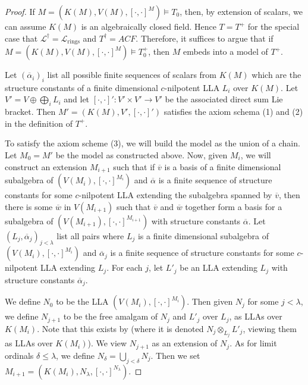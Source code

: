 \documentclass[psamsfonts]{amsart}
\theoremstyle{definition}
\theoremstyle{definition}
\theoremstyle{remark}
\numberwithin{equation}{section}
\newcommand\LL{\mathscr{L}}
\renewcommand{\models}{\vDash}
\begin{document}
\begin{proof}
 If $M = (K(M), V(M), [\cdot,\cdot]^{M}) \models T_{0}$, then, by extension of scalars, we can assume $K(M)$ is an algebraically closed field. Hence $T = T^{+}$ for the special case that $\LL^{\dagger} = \LL_{\mathrm{rings}}$ and $T^{\dagger} = ACF$.  Therefore, it suffices to argue that if $M = (K(M), V(M), [\cdot,\cdot]^{M}) \models T_{0}^{+}$, then $M$ embeds into a model of $T^{+}$.  
 
 Let $(\overline{\alpha}_{i})_{i}$ list all possible finite sequences of scalars from $K(M)$ which are the structure constants of a finite dimensional $c$-nilpotent LLA $L_{i}$ over $K(M)$.  Let $V' = V \oplus \bigoplus_{i} L_{i}$ and let $[\cdot,\cdot]' : V' \times V' \to V'$ be the associated direct sum Lie bracket.  Then $M' = (K(M), V', [\cdot,\cdot]')$ satisfies the axiom schema (1) and (2) in the definition of $T^{+}$.  

    To satisfy the axiom scheme (3), we will build the model as the union of a chain.  Let $M_{0} = M'$ be the model as constructed above. Now, given $M_{i}$, we will construct an extension $M_{i+1}$ such that if $\overline{v}$ is a basis of a finite dimensional subalgebra of $(V(M_{i}),[\cdot,\cdot]^{M_{i}})$ and $\overline{\alpha}$ is a finite sequence of structure constants for some $c$-nilpotent LLA extending the subalgebra spanned by $\overline{v}$, then there is some $\overline{w}$ in $V(M_{i+1})$ such that $\overline{v}$ and $\overline{w}$ together form a basis for a subalgebra of $(V(M_{i+1}),[\cdot,\cdot]^{M_{i+1}})$ with structure constants $\overline{\alpha}$. Let $(L_{j},\overline{\alpha}_{j})_{j < \lambda}$ list all pairs where $L_{j}$ is a finite dimensional subalgebra of $(V(M_{i}),[\cdot,\cdot]^{M_{i}})$ and $\overline{\alpha}_j$ is a finite sequence of structure constants for some $c$-nilpotent LLA extending $L_{j}$.  For each $j$, let $L'_{j}$ be an LLA extending $L_{j}$ with structure constants $\overline{\alpha}_{j}$.  
    
    We define $N_{0}$ to be the LLA $(V(M_{i}), [\cdot,\cdot]^{M_{i}})$.  Then given $N_{j}$ for some $j < \lambda$, we define $N_{j+1}$ to be the free amalgam of $N_{j}$ and $L'_{j}$ over $L_{j}$, as LLAs over $K(M_{i})$. Note that this exists by \cite[Theorem 4.35]{d2023model} (where it is denoted $N_{j} \otimes_{L_{j}} L'_{j}$, viewing them as LLAs over $K(M_{i})$).  We view $N_{j+1}$ as an extension of $N_{j}$.  As for limit ordinals $\delta \leq \lambda$, we define $N_{\delta} = \bigcup_{j < \delta} N_{j}$. Then we set $M_{i+1} = (K(M_{i}), N_{\lambda}, [\cdot,\cdot]^{N_{\lambda}})$. 


\end{proof}
\end{document}
